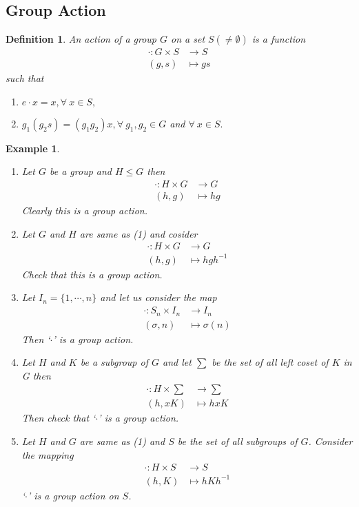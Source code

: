 \documentclass[11pt]{amsart}
\newtheorem{defn}[theorem]{Definition}
\newtheorem{eg}[theorem]{Example}
\begin{document}
\subsection{Group Action}
\begin{defn}
An action of a group $G$ on a set $S(\neq \emptyset)$ is a function \begin{align*}
\cdot:G\times S&\to S\\
(g,s)&\mapsto gs
\end{align*}
such that \begin{enumerate}
\item $e\cdot x=x,\forall~x\in S,$
\item $g_1(g_2s)=(g_1g_2)x,\forall~g_1,g_2\in G$ and $\forall~x\in S.$
\end{enumerate}
\end{defn}
\begin{eg}
\begin{enumerate}
\item Let $G$ be a group and $H\leq G$ then  \begin{align*}
\cdot:H\times G&\to G\\
(h,g)&\mapsto hg
\end{align*}
Clearly this is a group action.
\item Let $G$ and $H$ are same as (1) and cosider  \begin{align*}
\cdot:H\times G&\to G\\
(h,g)&\mapsto hgh^{-1}
\end{align*}
Check that this is a group action.
\item Let $I_n=\{1,\cdots,n\}$ and let us consider the map \begin{align*}
\cdot:S_n\times I_n&\to I_n\\
(\sigma,n)&\mapsto \sigma(n)
\end{align*}
Then `$\cdot$' is a group action.
\item Let $H$ and $K$ be a subgroup of $G$ and let $\sum$ be the set of all left coset of $K$ in G then \begin{align*}
\cdot:H\times \sum&\to \sum\\
(h,xK)&\mapsto hxK
\end{align*}
Then check that `$\cdot$' is a group action.
\item Let $H$ and $G$ are same as (1) and $S$ be the set of all subgroups of $G$. Consider the mapping \begin{align*}
\cdot:H\times S&\to S\\
(h,K)&\mapsto hKh^{-1}
\end{align*}
`$\cdot$' is a group action on $S$.
\end{enumerate}
\end{eg}
\end{document}
